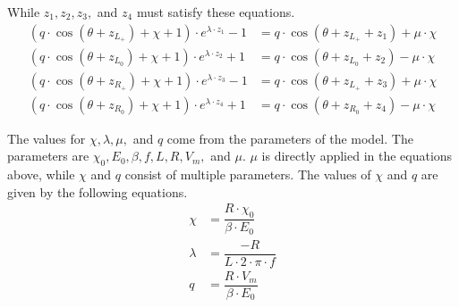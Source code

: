 While $z_1, z_2, z_3,$ and $z_4$ must satisfy these equations.
\begin{subequations}
\begin{align}
    (q \cdot \cos(\theta + z_{L_+}) + \chi + 1) \cdot e^{\lambda \cdot z_1} - 1
    & = q \cdot  \cos(\theta + z_{L_+} + z_1) + \mu \cdot \chi \\
    (q \cdot \cos(\theta + z_{L_0}) + \chi + 1) \cdot e^{\lambda \cdot z_2} + 1
    & = q \cdot  \cos(\theta + z_{L_0} + z_2) - \mu \cdot \chi \\
    (q \cdot \cos(\theta + z_{R_+}) + \chi + 1) \cdot e^{\lambda \cdot z_3} - 1
    & = q \cdot  \cos(\theta + z_{L_+} + z_3) + \mu \cdot \chi \\
    (q \cdot \cos(\theta + z_{R_0}) + \chi + 1) \cdot e^{\lambda \cdot z_4} + 1
    & = q \cdot  \cos(\theta + z_{R_0} + z_4) - \mu \cdot \chi
\end{align}
\end{subequations}


The values for $\chi, \lambda, \mu,$ and $q$ come from the parameters of the model.
The parameters are $\chi_0, E_0, \beta, f, L, R, V_m,$ and $\mu$.
$\mu$ is directly applied in the equations above, while $\chi$ and $q$ consist of multiple parameters.
The values of $\chi$ and $q$ are given by the following equations.
\begin{align}
    \chi & = \dfrac{R \cdot \chi_0}{\beta \cdot E_0} \\
    \lambda & = \dfrac{-R}{L \cdot 2 \cdot \pi \cdot f} \\
    q & = \dfrac{R \cdot V_m}{\beta \cdot E_0}
\end{align}
